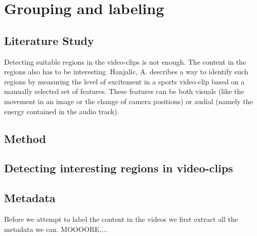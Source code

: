 %
\section{Grouping and labeling}
%

%
\subsection{Literature Study}
%
Detecting suitable regions in the video-clips is not enough. The content in the regions also has to be interesting. Hanjalic, A. \cite{citeulike:405480} describes a way to identify such regions by measuring the level of excitement in a sports video-clip based on a manually selected set of features. These features can be both visuals (like the movement in an image or the change of camera positions) or audial (namely the energy contained in the audio track).%
%
\subsection{Method}
%

%
\subsection{Detecting interesting regions in video-clips}
%

%
\subsection{Metadata}
%
Before we attempt to label the content in the videos we first extract all the metadata we can. MOOOORE....
%

